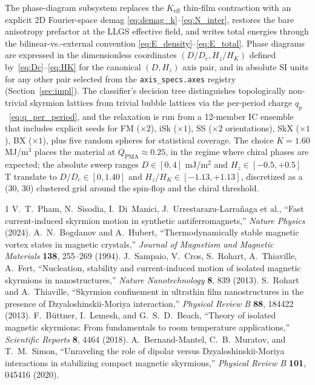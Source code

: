 \documentclass[11pt,a4paper]{article}
\newcommand{\Keff}{K_{\text{eff}}}
\newcommand{\HK}{H_K}
\newcommand{\Dc}{D_c}
\newcommand{\Qpma}{Q_{\text{PMA}}}
\begin{document}
The phase-diagram subsystem replaces the $\Keff$ thin-film
contraction with an explicit 2D Fourier-space demag
\eqref{eq:demag_k}--\eqref{eq:N_inter}, restores the bare
anisotropy prefactor at the LLGS effective field, and writes
total energies through the bilinear-vs.-external convention
\eqref{eq:E_density}--\eqref{eq:E_total}. Phase diagrams are
expressed in the dimensionless coordinates
$(D/\Dc, H_z/\HK)$ defined by~\eqref{eq:Dc}--\eqref{eq:HK}
for the canonical $(D, H_z)$ axis pair, and in absolute
SI units for any other pair selected from the
\texttt{axis\_specs.axes} registry
(Section~\ref{sec:impl}). The classifier's decision tree
distinguishes topologically non-trivial skyrmion lattices
from trivial bubble lattices via the per-period charge
$q_p$~\eqref{eq:q_per_period}, and the relaxation is run
from a 12-member IC ensemble that includes explicit seeds
for FM ($\times 2$), iSk ($\times 1$), SS ($\times 2$
orientations), SkX ($\times 1$), BX ($\times 1$), plus
five random spheres for statistical coverage. The choice
$K = 1.60$ MJ/m$^3$ places the material at
$\Qpma \approx 0.25$, in the regime where chiral phases
are expected; the absolute sweep ranges $D \in [0, 4]$
mJ/m$^2$ and $H_z \in [-0.5, +0.5]$ T translate to
$D/\Dc \in [0, 1.40]$ and $H_z/\HK \in [-1.13, +1.13]$,
discretized as a (30, 30) clustered grid around the
spin-flop and the chiral threshold.

\begin{thebibliography}{1}
V.~T.~Pham, N.~Sisodia, I.~Di~Manici,
J.~Urrestarazu-Larra\~{n}aga et al.,
``Fast current-induced skyrmion motion in synthetic
antiferromagnets,''
\emph{Nature Physics} (2024).
A.~N.~Bogdanov and A.~Hubert,
``Thermodynamically stable magnetic vortex states in
magnetic crystals,''
\emph{Journal of Magnetism and Magnetic Materials}
\textbf{138}, 255--269 (1994).
J.~Sampaio, V.~Cros, S.~Rohart, A.~Thiaville, A.~Fert,
``Nucleation, stability and current-induced motion of
isolated magnetic skyrmions in nanostructures,''
\emph{Nature Nanotechnology} \textbf{8}, 839 (2013).
S.~Rohart and A.~Thiaville,
``Skyrmion confinement in ultrathin film nanostructures
in the presence of Dzyaloshinskii-Moriya interaction,''
\emph{Physical Review B} \textbf{88}, 184422 (2013).
F.~B\"{u}ttner, I.~Lemesh, and G.~S.~D.~Beach,
``Theory of isolated magnetic skyrmions: From
fundamentals to room temperature applications,''
\emph{Scientific Reports} \textbf{8}, 4464 (2018).
A.~Bernand-Mantel, C.~B.~Muratov, and T.~M.~Simon,
``Unraveling the role of dipolar versus
Dzyaloshinskii-Moriya interactions in stabilizing
compact magnetic skyrmions,''
\emph{Physical Review B} \textbf{101}, 045416 (2020).
\end{thebibliography}
\end{document}
